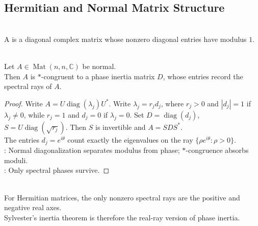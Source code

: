 \subsection{Hermitian and Normal Matrix Structure}

\begin{definition} \label{def:phase-inertia-matrix} \\
A  is a diagonal complex matrix whose nonzero diagonal entries have modulus $1$.
\end{definition}

\begin{proposition} \label{prop:normal-matrix-phase-inertia-form} \\
Let $A\in\operatorname{Mat}(n,n,\mathbb{C})$ be normal.\\
Then $A$ is $*$-congruent to a phase inertia matrix $D$, whose entries record the spectral rays of $A$.
\begin{proof}
Write $A=U\operatorname{diag}(\lambda_j)U^*$. Write $\lambda_j=r_jd_j$, where $r_j>0$ and $|d_j|=1$ if $\lambda_j\neq0$, while $r_j=1$ and $d_j=0$ if $\lambda_j=0$. Set $D=\operatorname{diag}(d_j)$, $S=U\operatorname{diag}(\sqrt{r_j})$. Then $S$ is invertible and $A=SDS^*$.\\
The entries $d_j=e^{i\theta}$ count exactly the eigenvalues on the ray $\{\rho e^{i\theta}:\rho>0\}$.\\
: Normal diagonalization separates modulus from phase; $*$-congruence absorbs moduli.\\
: Only spectral phases survive.
\end{proof}
\end{proposition}

\begin{perspective} \label{per:hermitian-inertia-as-real-phase-inertia} \\
For Hermitian matrices, the only nonzero spectral rays are the positive and negative real axes.\\
Sylvester's inertia theorem is therefore the real-ray version of phase inertia.
\end{perspective}
